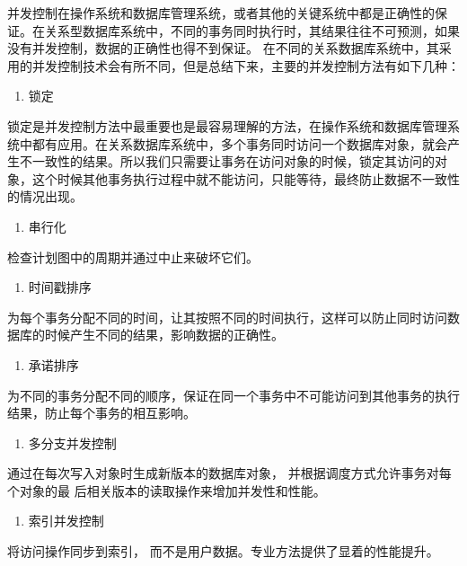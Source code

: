 并发控制在操作系统和数据库管理系统，或者其他的关键系统中都是正确性的保证。在关系型数据库系统中，不同的事务同时执行时，其结果往往不可预测，如果没有并发控制，数据的正确性也得不到保证。
在不同的关系数据库系统中，其采用的并发控制技术会有所不同，但是总结下来，主要的并发控制方法有如下几种：

	\begin{enumerate}
		\item 锁定
	\end{enumerate}


  锁定是并发控制方法中最重要也是最容易理解的方法，在操作系统和数据库管理系统中都有应用。在关系数据库系统中，多个事务同时访问一个数据库对象，就会产生不一致性的结果。所以我们只需要让事务在访问对象的时候，锁定其访问的对象，这个时候其他事务执行过程中就不能访问，只能等待，最终防止数据不一致性的情况出现。
	
	\begin{enumerate}[resume]
		\item 串行化
	\end{enumerate}

 检查计划图中的周期并通过中止来破坏它们。
 \begin{enumerate}[resume]
 	\item 时间戳排序
 \end{enumerate}

  为每个事务分配不同的时间，让其按照不同的时间执行，这样可以防止同时访问数据库的时候产生不同的结果，影响数据的正确性。
   
    \begin{enumerate}[resume]
   	\item 承诺排序
   \end{enumerate}

 为不同的事务分配不同的顺序，保证在同一个事务中不可能访问到其他事务的执行结果，防止每个事务的相互影响。
 
\begin{enumerate}[resume]
	\item 多分支并发控制
\end{enumerate}

通过在每次写入对象时生成新版本的数据库对象，
	并根据调度方式允许事务对每个对象的最
	后相关版本的读取操作来增加并发性和性能。
	
	\begin{enumerate}[resume]
		\item 索引并发控制
	\end{enumerate}

将访问操作同步到索引，
而不是用户数据。专业方法提供了显着的性能提升。

